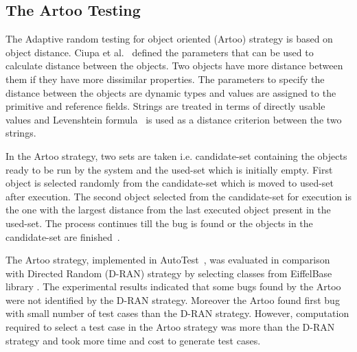 \subsection{The Artoo Testing}
The Adaptive random testing for object oriented (Artoo) strategy is based on object distance. Ciupa et al.~\cite{ciupa2006object} defined the parameters that can be used to calculate distance between the objects. Two objects have more distance between them if they have more dissimilar properties. The parameters to specify the distance between the objects are dynamic types and values are assigned to the primitive and reference fields. Strings are treated in terms of directly usable values and Levenshtein formula~\cite{levenshtein1966binary} is used as a distance criterion between the two strings.

In the Artoo strategy, two sets are taken i.e. candidate-set containing the objects ready to be run by the system and the used-set which is initially empty. First object is selected randomly from the candidate-set which is moved to used-set after execution. The second object selected from the candidate-set for execution is the one with the largest distance from the last executed object present in the used-set. The process continues till the bug is found or the objects in the candidate-set are finished~\cite{ciupa2006object}.

The Artoo strategy, implemented in AutoTest~\cite{ciupa2008artoo}, was evaluated in comparison with Directed Random (D-RAN) strategy by selecting classes from EiffelBase library \cite{meyer1987eiffel}. The experimental results indicated that some bugs found by the Artoo were not identified by the D-RAN strategy. Moreover the Artoo found first bug with small number of test cases than the D-RAN strategy. However, computation required to select a test case in the Artoo strategy was more than the D-RAN strategy and took more time and cost to generate test cases.

